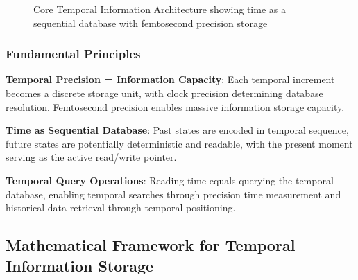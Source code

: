 \documentclass[12pt,a4paper]{article}
\begin{document}
{\begin{figure}[H]
\caption{Core Temporal Information Architecture showing time as a sequential database with femtosecond precision storage}
\label{fig:temporal_information_architecture}
\end{figure}

\subsubsection{Fundamental Principles}

\textbf{Temporal Precision = Information Capacity}:
Each temporal increment becomes a discrete storage unit, with clock precision determining database resolution. Femtosecond precision enables massive information storage capacity.

\textbf{Time as Sequential Database}:
Past states are encoded in temporal sequence, future states are potentially deterministic and readable, with the present moment serving as the active read/write pointer.

\textbf{Temporal Query Operations}:
Reading time equals querying the temporal database, enabling temporal searches through precision time measurement and historical data retrieval through temporal positioning.

\subsection{Mathematical Framework for Temporal Information Storage}

}
\end{document}
